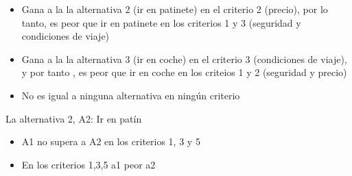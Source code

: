 \documentclass[
]{article}
\newenvironment{Shaded}{\begin{snugshade}}{\end{snugshade}}
\newcommand{\NormalTok}[1]{#1}
\newcommand{\SpecialCharTok}[1]{\textcolor[rgb]{0.00,0.00,0.00}{#1}}
\providecommand{\tightlist}{%
  \setlength{\itemsep}{0pt}\setlength{\parskip}{0pt}}
\begin{document}
\begin{itemize}
\tightlist
\item
  Gana a la la alternativa 2 (ir en patinete) en el criterio 2 (precio),
  por lo tanto, es peor que ir en patinete en los criterios 1 y 3
  (seguridad y condiciones de viaje)
\item
  Gana a la la alternativa 3 (ir en coche) en el criterio 3 (condiciones
  de viaje), y por tanto , es peor que ir en coche en los criteios 1 y 2
  (seguridad y precio)
\item
  No es igual a ninguna alternativa en ningún criterio
\end{itemize}

La alternativa 2, A2: Ir en patín

\begin{itemize}
\tightlist
\item
  A1 no supera a A2 en los criterios 1, 3 y 5
\item
  En los criterios 1,3,5 a1 peor a2
\end{itemize}

\begin{Shaded}
\end{Shaded}
\end{document}
